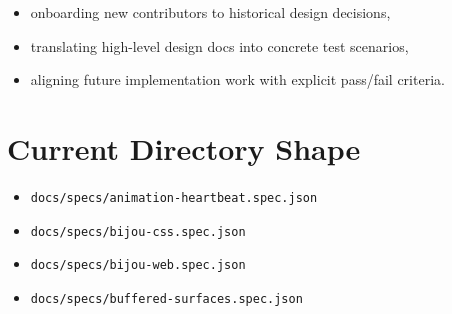 \begin{itemize}
\tightlist
\item
  onboarding new contributors to historical design decisions,
\item
  translating high-level design docs into concrete test scenarios,
\item
  aligning future implementation work with explicit pass/fail criteria.
\end{itemize}

\section{Current Directory Shape}\label{record-012-current-directory-shape}

\begin{itemize}
\tightlist
\item
  \texttt{d\allowbreak{}o\allowbreak{}c\allowbreak{}s\allowbreak{}/\allowbreak{}s\allowbreak{}p\allowbreak{}e\allowbreak{}c\allowbreak{}s\allowbreak{}/\allowbreak{}a\allowbreak{}n\allowbreak{}i\allowbreak{}m\allowbreak{}a\allowbreak{}t\allowbreak{}i\allowbreak{}o\allowbreak{}n\allowbreak{}-\allowbreak{}h\allowbreak{}e\allowbreak{}a\allowbreak{}r\allowbreak{}t\allowbreak{}b\allowbreak{}e\allowbreak{}a\allowbreak{}t\allowbreak{}.\allowbreak{}s\allowbreak{}p\allowbreak{}e\allowbreak{}c\allowbreak{}.\allowbreak{}j\allowbreak{}s\allowbreak{}o\allowbreak{}n}
\item
  \texttt{d\allowbreak{}o\allowbreak{}c\allowbreak{}s\allowbreak{}/\allowbreak{}s\allowbreak{}p\allowbreak{}e\allowbreak{}c\allowbreak{}s\allowbreak{}/\allowbreak{}b\allowbreak{}i\allowbreak{}j\allowbreak{}o\allowbreak{}u\allowbreak{}-\allowbreak{}c\allowbreak{}s\allowbreak{}s\allowbreak{}.\allowbreak{}s\allowbreak{}p\allowbreak{}e\allowbreak{}c\allowbreak{}.\allowbreak{}j\allowbreak{}s\allowbreak{}o\allowbreak{}n}
\item
  \texttt{d\allowbreak{}o\allowbreak{}c\allowbreak{}s\allowbreak{}/\allowbreak{}s\allowbreak{}p\allowbreak{}e\allowbreak{}c\allowbreak{}s\allowbreak{}/\allowbreak{}b\allowbreak{}i\allowbreak{}j\allowbreak{}o\allowbreak{}u\allowbreak{}-\allowbreak{}w\allowbreak{}e\allowbreak{}b\allowbreak{}.\allowbreak{}s\allowbreak{}p\allowbreak{}e\allowbreak{}c\allowbreak{}.\allowbreak{}j\allowbreak{}s\allowbreak{}o\allowbreak{}n}
\item
  \texttt{d\allowbreak{}o\allowbreak{}c\allowbreak{}s\allowbreak{}/\allowbreak{}s\allowbreak{}p\allowbreak{}e\allowbreak{}c\allowbreak{}s\allowbreak{}/\allowbreak{}b\allowbreak{}u\allowbreak{}f\allowbreak{}f\allowbreak{}e\allowbreak{}r\allowbreak{}e\allowbreak{}d\allowbreak{}-\allowbreak{}s\allowbreak{}u\allowbreak{}r\allowbreak{}f\allowbreak{}a\allowbreak{}c\allowbreak{}e\allowbreak{}s\allowbreak{}.\allowbreak{}s\allowbreak{}p\allowbreak{}e\allowbreak{}c\allowbreak{}.\allowbreak{}j\allowbreak{}s\allowbreak{}o\allowbreak{}n}

\end{itemize}
